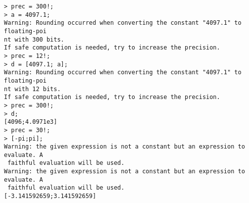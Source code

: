 \begin{center}\begin{minipage}{15cm}\begin{Verbatim}[frame=single]
> prec = 300!;
> a = 4097.1;
Warning: Rounding occurred when converting the constant "4097.1" to floating-poi
nt with 300 bits.
If safe computation is needed, try to increase the precision.
> prec = 12!;
> d = [4097.1; a];
Warning: Rounding occurred when converting the constant "4097.1" to floating-poi
nt with 12 bits.
If safe computation is needed, try to increase the precision.
> prec = 300!;
> d;
[4096;4.0971e3]
> prec = 30!;
> [-pi;pi];
Warning: the given expression is not a constant but an expression to evaluate. A
 faithful evaluation will be used.
Warning: the given expression is not a constant but an expression to evaluate. A
 faithful evaluation will be used.
[-3.141592659;3.141592659]
\end{Verbatim}
\end{minipage}\end{center}
